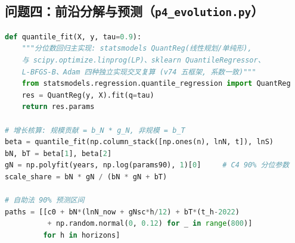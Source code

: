 \subsection{问题四：前沿分解与预测（\texttt{p4\_evolution.py}）}

\begin{lstlisting}[language=Python, basicstyle=\ttfamily\small]
def quantile_fit(X, y, tau=0.9):
    """分位数回归主实现: statsmodels QuantReg(线性规划/单纯形),
    与 scipy.optimize.linprog(LP)、sklearn QuantileRegressor、
    L-BFGS-B、Adam 四种独立实现交叉复算 (v74 五框架, 系数一致)"""
    from statsmodels.regression.quantile_regression import QuantReg
    res = QuantReg(y, X).fit(q=tau)
    return res.params

# 增长核算: 规模贡献 = b_N * g_N, 非规模 = b_T
beta = quantile_fit(np.column_stack([np.ones(n), lnN, t]), lnS)
bN, bT = beta[1], beta[2]
gN = np.polyfit(years, np.log(params90), 1)[0]     # C4 90% 分位参数
scale_share = bN * gN / (bN * gN + bT)

# 自助法 90% 预测区间
paths = [[c0 + bN*(lnN_now + gNsc*h/12) + bT*(t_h-2022)
          + np.random.normal(0, 0.12) for _ in range(800)]
         for h in horizons]
\end{lstlisting}